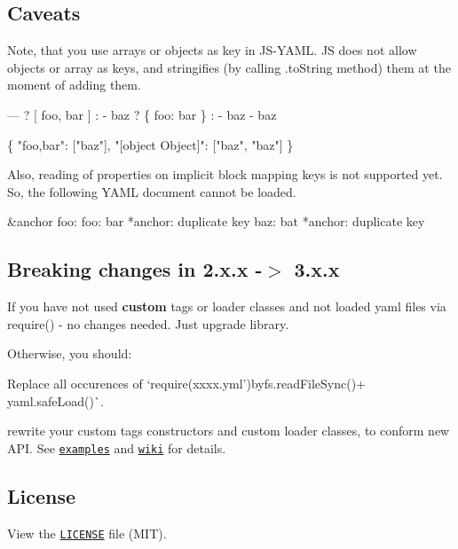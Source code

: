 \subsection*{Caveats }

Note, that you use arrays or objects as key in J\+S-\/\+Y\+A\+ML. JS does not allow objects or array as keys, and stringifies (by calling .to\+String method) them at the moment of adding them.


\begin{DoxyCode}
---
? [ foo, bar ]
: - baz
? \{ foo: bar \}
: - baz
  - baz
\end{DoxyCode}



\begin{DoxyCode}
\{ "foo,bar": ["baz"], "[object Object]": ["baz", "baz"] \}
\end{DoxyCode}


Also, reading of properties on implicit block mapping keys is not supported yet. So, the following Y\+A\+ML document cannot be loaded.


\begin{DoxyCode}
&anchor foo:
  foo: bar
  *anchor: duplicate key
  baz: bat
  *anchor: duplicate key
\end{DoxyCode}


\subsection*{Breaking changes in 2.\+x.\+x -\/$>$ 3.\+x.\+x }

If you have not used {\bfseries custom} tags or loader classes and not loaded yaml files via {\ttfamily require()} -\/ no changes needed. Just upgrade library.

Otherwise, you should\+:


\begin{DoxyEnumerate}
\item Replace all occurences of `require(\textquotesingle{}xxxx.\+yml'){\ttfamily by}fs.\+read\+File\+Sync(){\ttfamily + }yaml.\+safe\+Load()\`{}.
\item rewrite your custom tags constructors and custom loader classes, to conform new A\+PI. See \href{https://github.com/nodeca/js-yaml/tree/master/examples}{\tt examples} and \href{https://github.com/nodeca/js-yaml/wiki}{\tt wiki} for details.
\end{DoxyEnumerate}

\subsection*{License }

View the \href{https://github.com/nodeca/js-yaml/blob/master/LICENSE}{\tt L\+I\+C\+E\+N\+SE} file (M\+IT). 